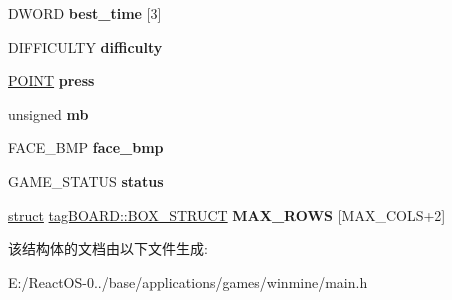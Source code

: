 \begin{DoxyCompactItemize}
\mbox{\label{structtag_b_o_a_r_d_a8ba08be46f744fad3e468ce206b014f1}} 
D\+W\+O\+RD {\bfseries best\+\_\+time} \mbox{[}3\mbox{]}
\item 
\mbox{\label{structtag_b_o_a_r_d_a17f7c089fadc650b2f038bc2f7bc121b}} 
D\+I\+F\+F\+I\+C\+U\+L\+TY {\bfseries difficulty}
\item 
\mbox{\label{structtag_b_o_a_r_d_af918401797142d04732cc395ace1f883}} 
\hyperlink{structtag_p_o_i_n_t}{P\+O\+I\+NT} {\bfseries press}
\item 
\mbox{\label{structtag_b_o_a_r_d_a0e046c46c7e3539801c94c98660a0f72}} 
unsigned {\bfseries mb}
\item 
\mbox{\label{structtag_b_o_a_r_d_ac0b85dd5f4cdee6c6e9c6639b1ffb6ff}} 
F\+A\+C\+E\+\_\+\+B\+MP {\bfseries face\+\_\+bmp}
\item 
\mbox{\label{structtag_b_o_a_r_d_a28384b1948dc14e155893fcfae221293}} 
G\+A\+M\+E\+\_\+\+S\+T\+A\+T\+US {\bfseries status}
\item 
\mbox{\label{structtag_b_o_a_r_d_aef3ba9929cf663ae30f1cbd73bc2ab04}} 
\hyperlink{interfacestruct}{struct} \hyperlink{structtag_b_o_a_r_d_1_1_b_o_x___s_t_r_u_c_t}{tag\+B\+O\+A\+R\+D\+::\+B\+O\+X\+\_\+\+S\+T\+R\+U\+CT} {\bfseries M\+A\+X\+\_\+\+R\+O\+WS} \mbox{[}M\+A\+X\+\_\+\+C\+O\+LS+2\mbox{]}
\end{DoxyCompactItemize}


该结构体的文档由以下文件生成\+:\begin{DoxyCompactItemize}
\item 
E\+:/\+React\+O\+S-\/0../base/applications/games/winmine/main.\+h\end{DoxyCompactItemize}
